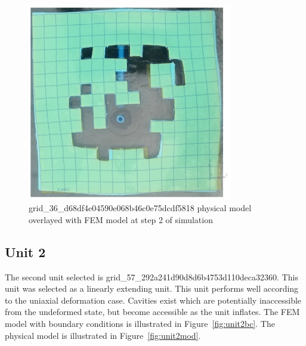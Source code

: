 \begin{figure}[H]
	\centering
	\includegraphics[width=0.8\textwidth]{unit1defover.png}
	\caption[Physical model of unit 1 overlayed with FEM model]{grid\_36\_d68df4e04590e068b46c0e75dcdf5818 physical model overlayed with FEM model at step 2 of simulation}
	\label{fig:unit1over}
\end{figure}

\subsection{Unit 2}

The second unit selected is grid\_57\_292a241d90d8d6b4753d110deca32360. This unit was selected as a linearly extending unit. This unit performs well according to the uniaxial deformation case. Cavities exist which are potentially inaccessible from the undeformed state, but become accessible as the unit inflates. The FEM model with boundary conditions is illustrated in Figure~\ref{fig:unit2bc}. The physical model is illustrated in Figure~\ref{fig:unit2mod}.

